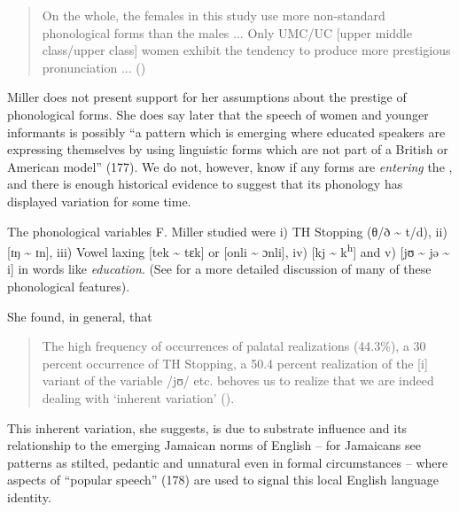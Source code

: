 \begin{quote}On the whole, the females in this study use more non-standard phonological forms than the males ... Only UMC\slash UC [upper middle class\slash upper class] women exhibit the tendency to produce more prestigious pronunciation ... \hbox{}\hfill\hbox{(\citeyear[112--113]{Miller1987})} \end{quote}  

Miller does not present support for her assumptions about the prestige of  phonological forms.  She does say later that the speech of women and younger informants is possibly “a pattern which is emerging where educated speakers are expressing themselves by using linguistic forms which are not part of a British or American model” (177).  We do not, however, know if any forms are \textit{entering} the , and there is enough historical evidence to suggest that its phonology has displayed variation for some time.

The phonological variables F. Miller studied were i) TH Stopping (θ/ð {\textasciitilde} t/d), ii) [ɪŋ {\textasciitilde} ɪn], iii) Vowel laxing [tek {\textasciitilde} tɛk] or [onli {\textasciitilde} ɔnli], iv) [kj {\textasciitilde} k\textsuperscript{h}] and v) [jʊ {\textasciitilde} jǝ {\textasciitilde} i] in words like \textit{education}.  (See  for a more detailed discussion of many of these phonological features). 

She found, in general, that

\begin{quote}The high frequency of occurrences of palatal realizations (44.3\%), a 30 percent occurrence of TH Stopping, a 50.4 percent realization of the [i] variant of the variable /jʊ/ etc. behoves us to realize that we are indeed dealing with ‘inherent variation’ (\citeyear[183--184]{Miller1987}).\end{quote} 

This inherent variation, she suggests, is due to substrate  influence and its relationship to the emerging Jamaican norms of English – for Jamaicans see  patterns as stilted, pedantic and unnatural even in formal circumstances – where aspects of “popular speech” (178) are used to signal this local English language identity.  

